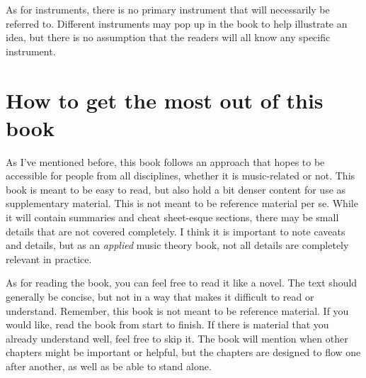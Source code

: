 \documentclass[../OpenAppliedMusicTheory.tex]{subfiles}
\begin{document}
    As for instruments, there is no primary instrument that will necessarily be referred to. Different instruments may pop up in the book to help illustrate an idea, but there is no assumption that the readers will all know any specific instrument.

    \section*{How to get the most out of this book}\label{about:efficient-usage}
    As I've mentioned before, this book follows an approach that hopes to be accessible for people from all disciplines, whether it is music-related or not. This book is meant to be easy to read, but also hold a bit denser content for use as supplementary material. This is not meant to be reference material per se. While it will contain summaries and cheat sheet-esque sections, there may be small details that are not covered completely. I think it is important to note caveats and details, but as an \emph{applied} music theory book, not all details are completely relevant in practice. 

    As for reading the book, you can feel free to read it like a novel. The text should generally be concise, but not in a way that makes it difficult to read or understand. Remember, this book is not meant to be reference material. If you would like, read the book from start to finish. If there is material that you already understand well, feel free to skip it. The book will mention when other chapters might be important or helpful, but the chapters are designed to flow one after another, as well as be able to stand alone.

\end{document}
